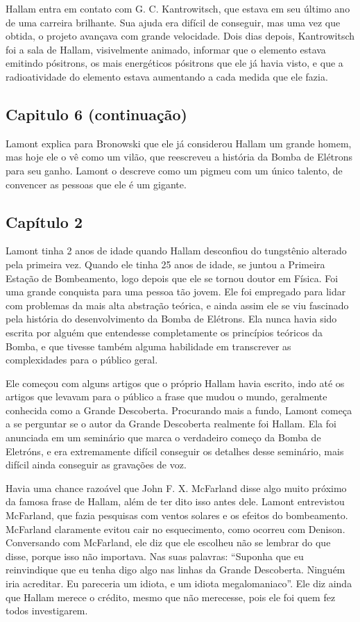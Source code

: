 \documentclass[14pt,portuguese]{extreport}
\begin{document}
	  Hallam entra em contato com G. C. Kantrowitsch, que estava em seu último ano de uma carreira brilhante. Sua ajuda era difícil de conseguir, mas uma vez que obtida, o projeto 
	  avançava com grande velocidade. Dois dias depois, Kantrowitsch foi a sala de Hallam, visivelmente animado, informar que o elemento estava emitindo pósitrons, os mais energéticos pósitrons que 
	  ele já havia visto, e que a radioatividade do elemento estava aumentando a cada medida que ele fazia.

	\subsection{Capitulo 6 (continuação)}

	  Lamont explica para Bronowski que ele já considerou Hallam um grande homem, mas hoje ele o vê como um vilão, que reescreveu a história da Bomba de Elétrons para seu ganho. 
	  Lamont o descreve como um pigmeu com um único talento, de convencer as pessoas que ele é um gigante.

	\subsection{Capítulo 2}

	  Lamont tinha 2 anos de idade quando Hallam desconfiou do tungstênio alterado pela primeira vez. Quando ele tinha 25 anos de idade, se juntou a Primeira Estação de Bombeamento, 
	  logo depois que ele se tornou doutor em Física. Foi uma grande conquista para uma pessoa tão jovem. Ele foi empregado para lidar com problemas da mais alta abstração teórica, 
	  e ainda assim ele se viu fascinado pela história do desenvolvimento da Bomba de Elétrons. Ela nunca havia sido escrita por alguém que entendesse completamente os princípios 
	  teóricos da Bomba, e que tivesse também alguma habilidade em transcrever as complexidades para o público geral.
	  
	  Ele começou com alguns artigos que o próprio Hallam havia escrito, indo até os artigos que levavam para o público a frase que mudou o mundo, geralmente conhecida como a Grande Descoberta. 
	  Procurando mais a fundo, Lamont começa a se perguntar se o autor da Grande Descoberta realmente foi Hallam. Ela foi anunciada em um seminário que marca o verdadeiro começo da 
	  Bomba de Eletróns, e era extremamente difícil conseguir os detalhes desse seminário, mais difícil ainda conseguir as gravações de voz. 
	  
	  Havia uma chance razoável que John F. X. McFarland disse algo muito próximo da famosa frase de Hallam, além de ter dito isso antes dele. 
	  Lamont entrevistou McFarland, que fazia pesquisas com ventos solares e os efeitos do bombeamento. McFarland claramente evitou cair no esquecimento, como ocorreu com Denison. 
	  Conversando com McFarland, ele diz que ele escolheu não se lembrar do que disse, porque isso não importava. Nas suas palavras: “Suponha que eu reinvindique que eu tenha digo algo nas linhas 
	  da Grande Descoberta. Ninguém iria acreditar. Eu pareceria um idiota, e um idiota megalomaniaco”. Ele diz ainda que Hallam merece o crédito, mesmo que não merecesse, pois ele foi 
	  quem fez todos investigarem.
	  
\end{document}
